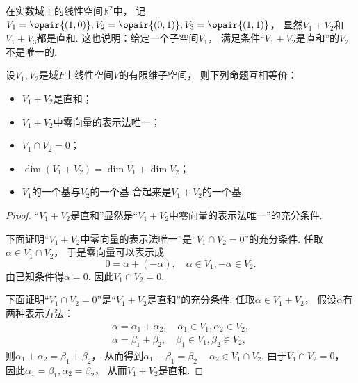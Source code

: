 \begin{example}\label{example:线性空间.子空间.直和.例1}
在实数域上的线性空间\(\mathbb{R}^2\)中，
记\(V_1=\opair{(1,0)},
V_2=\opair{(0,1)},
V_3=\opair{(1,1)}\)，
显然\(V_1+V_2\)和\(V_1+V_3\)都是直和.
这也说明：给定一个子空间\(V_1\)，
满足条件“\(V_1+V_2\)是直和”的\(V_2\)不是唯一的.
\end{example}

\begin{theorem}\label{theorem:线性空间.子空间.直和的等价命题}
设\(V_1,V_2\)是域\(F\)上线性空间\(V\)的有限维子空间，
则下列命题互相等价：\begin{itemize}
	\item \(V_1+V_2\)是直和；
	\item \(V_1+V_2\)中零向量的表示法唯一；
	\item \(V_1 \cap V_2=0\)；
	\item \(\dim(V_1+V_2)=\dim V_1+\dim V_2\)；
	\item \(V_1\)的一个基与\(V_2\)的一个基 合起来是\(V_1+V_2\)的一个基.
\end{itemize}
\begin{proof}
“\(V_1+V_2\)是直和”显然是“\(V_1+V_2\)中零向量的表示法唯一”的充分条件.

下面证明“\(V_1+V_2\)中零向量的表示法唯一”是“\(V_1 \cap V_2=0\)”的充分条件.
任取\(\alpha \in V_1 \cap V_2\)，
于是零向量可以表示成\[
	0 = \alpha + (-\alpha),
	\quad
	\alpha \in V_1,
	-\alpha \in V_2.
\]
由已知条件得\(\alpha = 0\).
因此\(V_1 \cap V_2 = 0\).

下面证明“\(V_1 \cap V_2=0\)”是“\(V_1+V_2\)是直和”的充分条件.
任取\(\alpha \in V_1 + V_2\)，
假设\(\alpha\)有两种表示方法：\begin{gather*}
	\alpha = \alpha_1 + \alpha_2,
	\quad \alpha_1 \in V_1,
	\alpha_2 \in V_2, \\
	\alpha = \beta_1 + \beta_2,
	\quad \beta_1 \in V_1,
	\beta_2 \in V_2,
\end{gather*}
则\(\alpha_1 + \alpha_2
= \beta_1 + \beta_2\)，
从而得到\(\alpha_1 - \beta_1
= \beta_2 - \alpha_2
\in V_1 \cap V_2\).
由于\(V_1 \cap V_2 = 0\)，
因此\(\alpha_1 = \beta_1,
\alpha_2 = \beta_2\)，
从而\(V_1 + V_2\)是直和.


\end{proof}
\end{theorem}
